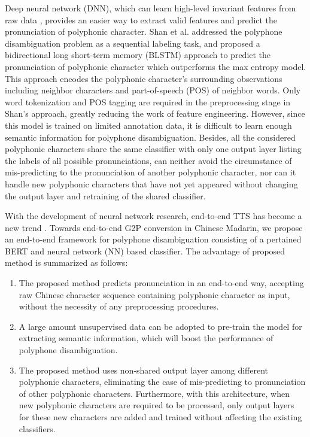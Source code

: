 \documentclass[a4paper]{article}
\begin{document}
Deep neural network (DNN), which can learn high-level invariant features from raw data \cite{bengio2013representation}, provides an easier way to extract valid features and predict the pronunciation of polyphonic character. Shan et al. \cite{shan2016bi} addressed the polyphone disambiguation problem as a sequential labeling task, and proposed a bidirectional long short-term memory (BLSTM) approach to predict the pronunciation of polyphonic character which outperforms the max entropy model. This approach encodes the polyphonic character’s surrounding observations including neighbor characters and part-of-speech (POS) of neighbor words. Only word tokenization and POS tagging are required in the preprocessing stage in Shan's approach, greatly reducing the work of feature engineering. However, since this model is trained on limited annotation data, it is difficult to learn enough semantic information for polyphone disambiguation. Besides, all the considered polyphonic characters share the same classifier with only one output layer listing the labels of all possible pronunciations, can neither avoid the circumstance of mis-predicting to the pronunciation of another polyphonic character, nor can it handle new polyphonic characters that have not yet appeared without changing the output layer and retraining of the shared classifier.

With the development of neural network research, end-to-end TTS has become a new trend \cite{sotelo2017char2wav, wang2017tacotron, li2018close}. Towards end-to-end G2P conversion in Chinese Madarin, we propose an end-to-end framework for polyphone disambiguation consisting of a pertained BERT \cite{devlin2018bert} and neural network (NN) based classifier. The advantage of proposed method is summarized as follows:
\begin{enumerate}
	\item The proposed method predicts pronunciation in an end-to-end way, accepting raw Chinese character sequence containing polyphonic character as input, without the necessity of any preprocessing procedures.
	\item A large amount unsupervised data can be adopted to pre-train the model for extracting semantic information, which will boost the performance of polyphone disambiguation.
	\item The proposed method uses non-shared output layer among different polyphonic characters, eliminating the case of mis-predicting to pronunciation of other polyphonic characters. Furthermore, with this architecture, when new polyphonic characters are required to be processed, only output layers for these new characters are added and trained without affecting the existing classifiers.
\end{enumerate}
\end{document}
